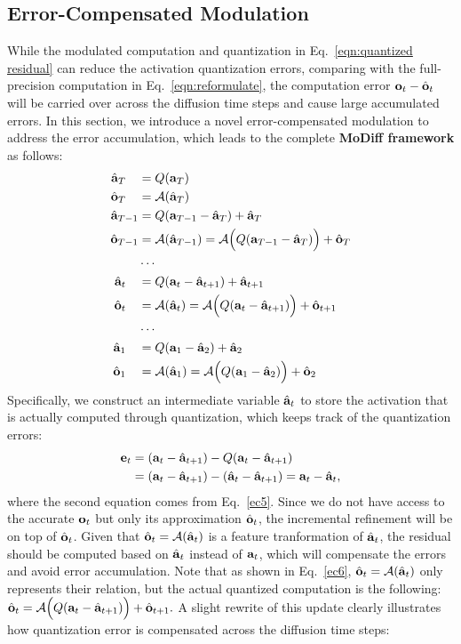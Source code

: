 \subsection{Error-Compensated Modulation}
\label{subsec:ecm}


While the modulated computation and quantization in Eq.~\eqref{eqn:quantized residual} can reduce the activation quantization errors, comparing with the full-precision computation in Eq.~\eqref{eqn:reformulate}, the computation error ${\mathbf{o}}_t - \hat {{\mathbf{o}}}_t$ will be carried over across the diffusion time steps and cause large accumulated errors. In this section, we introduce a novel error-compensated modulation to address the error accumulation, which leads to the complete \textbf{MoDiff framework} as follows:
\begin{align}
\label{ec1}
\hat {{\mathbf{a}}}_T\quad &= Q({\mathbf{a}}_T) 
\\
\label{ec2}
\hat{{\mathbf{o}}}_{T} \quad & = {\mathcal{A}} (\hat {{\mathbf{a}}}_T) 
\\
\label{ec3}
\hat {{\mathbf{a}}}_{T-1} &= Q({\mathbf{a}}_{T-1}-\hat {{\mathbf{a}}}_T) + \hat {{\mathbf{a}}}_T 
\\
\label{ec4}
\hat{{\mathbf{o}}}_{T-1} & = {\mathcal{A}}(\hat {{\mathbf{a}}}_{T-1}) = {\mathcal{A}}\Big( Q({\mathbf{a}}_{T-1}-\hat {{\mathbf{a}}}_T) \Big) + \hat{{\mathbf{o}}}_{T} 
\\ 
& \cdots 
\\
\label{ec5}
\hat {{\mathbf{a}}}_{t}\quad &= Q({\mathbf{a}}_{t}-\hat {{\mathbf{a}}}_{t+1}) + \hat {{\mathbf{a}}}_{t+1} 
\\
\label{ec6}
\hat{{\mathbf{o}}}_{t}\quad & = {\mathcal{A}}(\hat {{\mathbf{a}}}_{t}) = {\mathcal{A}}\Big( Q({\mathbf{a}}_{t}-\hat {{\mathbf{a}}}_{t+1}) \Big) + \hat{{\mathbf{o}}}_{t+1} 
\\ 
& \cdots 
\\
\label{ec7}
\hat {{\mathbf{a}}}_{1}\quad &= Q({\mathbf{a}}_{1}-\hat {{\mathbf{a}}}_{2}) + \hat {{\mathbf{a}}}_{2} 
\\
\label{ec8}
\hat{{\mathbf{o}}}_{1}\quad &  = {\mathcal{A}}(\hat{{\mathbf{a}}}_{1}) = {\mathcal{A}}\Big(Q({\mathbf{a}}_{1}-\hat{{\mathbf{a}}}_{2})\Big) + \hat{{\mathbf{o}}}_{2} 
\end{align}
Specifically, we construct an intermediate variable $\hat {{\mathbf{a}}}_t$ to store the activation that is actually computed through quantization, which keeps track of the quantization errors: 
\begin{align}
{\mathbf{e}}_t &= ({\mathbf{a}}_t - \hat {{\mathbf{a}}}_{t+1}) - Q({\mathbf{a}}_t - \hat {{\mathbf{a}}}_{t+1})  \\
&= ({\mathbf{a}}_t - \hat {{\mathbf{a}}}_{t+1}) - (\hat {{\mathbf{a}}}_t - \hat {{\mathbf{a}}}_{t+1}) \nonumber = {\mathbf{a}}_t - \hat{{\mathbf{a}}}_t, 
\end{align}
where the second equation comes from Eq.~\eqref{ec5}. Since we do not have access to the accurate ${\mathbf{o}}_t$ but only its approximation $\hat {{\mathbf{o}}}_t$, the incremental refinement will be on top of $\hat {{\mathbf{o}}}_t$. Given that $\hat {{\mathbf{o}}}_t = {\mathcal{A}}(\hat {{\mathbf{a}}}_{t})$ is a feature tranformation of $\hat {{\mathbf{a}}}_{t}$, the residual should be computed based on $\hat {{\mathbf{a}}}_{t}$ instead of ${\mathbf{a}}_{t}$, which will compensate the errors and avoid error accumulation. Note that as shown in Eq.~\eqref{ec6}, $\hat {{\mathbf{o}}}_t = {\mathcal{A}}(\hat {{\mathbf{a}}}_{t})$ only represents their relation, but the actual quantized computation is the following: $\hat{{\mathbf{o}}}_{t} = {\mathcal{A}}\Big( Q({\mathbf{a}}_{t}-\hat {{\mathbf{a}}}_{t+1}) \Big) + \hat{{\mathbf{o}}}_{t+1}.$ A slight rewrite of this update clearly illustrates how quantization error is compensated across the diffusion time steps:
